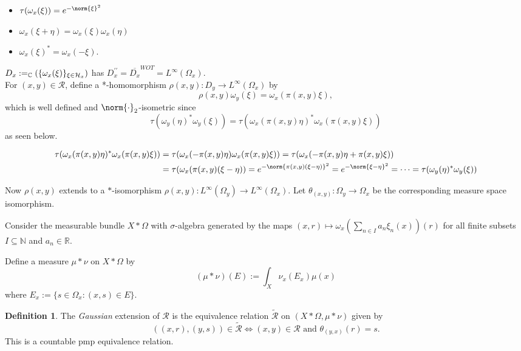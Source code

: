 \documentclass[12pt,letterpaper]{article}
\newcommand{\sub}{\subseteq}
\newcommand{\lr}[1]{\left(#1\right)}
\newcommand{\C}{\mathbb{C}}
\newcommand{\N}{\mathbb{N}\xspace}
\newcommand{\R}{\mathbb{R}\xspace}
\renewcommand{\H}{\mathcal{H}}
\let\Span\relax
\DeclareMathOperator{\Span}{Span}
\newcommand*\cls[1]{\overline{#1}}
\theoremstyle{definition}
\newtheorem{definition}{Definition}[]
\theoremstyle{plain}
\theoremstyle{remark}
\begin{document}
\begin{itemize}
    \item $ \tau(\omega_{x}(\xi)) = e^{-\norm{\xi}^{2}} $ 
    \item $ \omega_{x}(\xi+\eta) = \omega_{x}(\xi) \omega_{x}(\eta) $
    \item $ \omega_{x}(\xi)^{*} = \omega_{x}(-\xi) $.
\end{itemize}

$ D_{x}:=\Span_{\C}(\{\omega_{x}(\xi)\}_{\xi\in\H_{x}}) $ has $ D_{x}^{\prime\prime} = \cls{D_{x}}^{WOT} = L^{\infty}(\Omega_{x}) $.\\

For $ (x,y)\in \mathcal{R} $, define a *-homomorphism $ \rho(x,y):D_{y}\to L^{\infty}(\Omega_{x}) $ by 
\[
    \rho(x,y) \omega_{y}(\xi) = \omega_{x}(\pi(x,y) \xi),
\]
which is well defined and $ \norm{\cdot}_{2} $-isometric since 
\[
    \tau(\omega_{y}(\eta)^{*} \omega_{y}(\xi)) = \tau(\omega_{x}(\pi(x,y)\eta)^{*} \omega_{x}(\pi(x,y) \xi))
\]
as seen below. 

\begin{align*}
    \tau(\omega_{x}(\pi(x,y)\eta)^{*} \omega_{x}(\pi(x,y) \xi)) &= \tau(\omega_{x}(-\pi(x,y)\eta) \omega_{x}(\pi(x,y) \xi)) = \tau(\omega_{x}(-\pi(x,y)\eta+ \pi(x,y) \xi))\\
    &= \tau(\omega_{x}(\pi(x,y)(\xi-\eta)) = e^{-\norm{\pi(x,y)(\xi-\eta)}^{2}} = e^{-\norm{\xi-\eta}^{2}} = \cdots = \tau(\omega_{y}(\eta)^{*} \omega_{y}(\xi)) 
\end{align*}

Now $ \rho(x,y) $ extends to a $ * $-isomorphism $ \rho(x,y): L^{\infty}(\Omega_{y})\to L^{\infty}(\Omega_{x}) $. Let $ \theta_{(x,y)}:\Omega_{y}\to \Omega_{x} $ be the corresponding measure space isomorphism.


Consider the measurable bundle $ X\ast \Omega $ with $ \sigma $-algebra generated by the maps $ (x,r)\mapsto \omega_{x}\lr{\sum_{n\in I}a_{n} \xi_{n}(x)}(r) $ for all finite subsets $ I\sub \N $ and $ a_{n}\in\R $.

Define a measure $ \mu\ast \nu $ on $ X\ast \Omega $ by 
\[
    (\mu\ast \nu)(E) := \int_{X} \nu_{x}(E_{x}) \mu(x)
\]
where $ E_{x} := \{s\in \Omega_{x}:(x,s)\in E\} $.

\begin{definition}
    The \textit{Gaussian} extension of $ \mathcal{R} $ is the equivalence relation $ \widetilde{\mathcal{R}} $ on $ (X\ast \Omega, \mu\ast \nu) $ given by 
    \[
        ((x,r),(y,s)) \in \widetilde{\mathcal{R}} \iff (x,y)\in \mathcal{R} \text{ and } \theta_{(y,x)}(r) = s.
    \]
    This is a countable pmp equivalence relation.
\end{definition}
\end{document}
